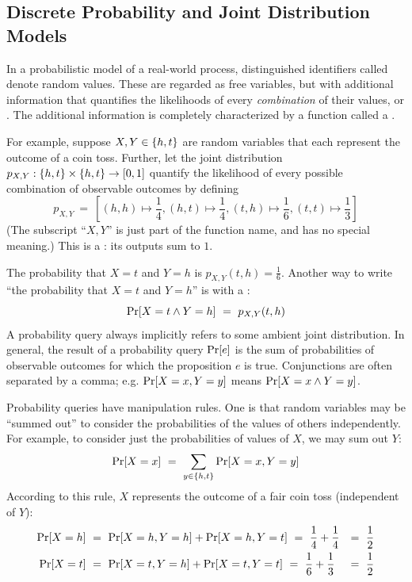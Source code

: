 \subsection{Discrete Probability and Joint Distribution Models}

In a probabilistic model of a real-world process, distinguished identifiers called  denote random values.
These are regarded as free variables, but with additional information that quantifies the likelihoods of every \emph{combination} of their values, or .
The additional information is completely characterized by a function called a .

For example, suppose $X,Y \in \{{h,t}\}$ are random variables that each represent the outcome of a coin toss.
Further, let the joint distribution $p_{X,Y} : \{{h,t}\} \times \{{h,t}\} \to [0,1]$ quantify the likelihood of every possible combination of observable outcomes by defining
\begin{equation}
	p_{X,Y}\ =\ \left[(h,h) \mapsto \frac{1}{4},
		(h,t) \mapsto \frac{1}{4},
		(t,h) \mapsto \frac{1}{6},
		(t,t) \mapsto \frac{1}{3}\right]
\end{equation}
(The subscript ``$X,Y$'' is just part of the function name, and has no special meaning.)
This is a : its outputs sum to $1$.

The probability that $X = t$ and $Y = h$ is $p_{X,Y}(t,h) = \frac{1}{6}$.
Another way to write ``the probability that $X = t$ and $Y = h$'' is with a :
\begin{equation}
	\Pspec{X = t \band Y = h}\ =\ p_{X,Y}(t,h)
\end{equation}
A probability query always implicitly refers to some ambient joint distribution.
In general, the result of a probability query $\mathrm{Pr}\!\left[{e}\right]$ is the sum of probabilities of observable outcomes for which the proposition $e$ is true.
Conjunctions are often separated by a comma; e.g. $\mathrm{Pr}\!\left[{X = x, Y = y}\right]$ means $\mathrm{Pr}\!\left[{X = x \wedge Y = y}\right]$.

Probability queries have manipulation rules.
One is that random variables may be ``summed out'' to consider the probabilities of the values of others independently.
For example, to consider just the probabilities of values of $X$, we may sum out $Y$:
\begin{equation}
	\mathrm{Pr}\!\left[{X = x}\right]\ =\ \sum_{y \in \{{h,t}\}} \mathrm{Pr}\!\left[{X = x, Y = y}\right]
\end{equation}
According to this rule, $X$ represents the outcome of a fair coin toss (independent of $Y$):
\begin{equation}
\begin{aligned}
	\Pspec{X = h}&\ =\ \Pspec{X = h, Y = h} + \Pspec{X = h, Y = t}\ =\ \frac{1}{4} + \frac{1}{4}&=\ \frac{1}{2}
\\
	\Pspec{X = t}&\ =\ \Pspec{X = t, Y = h} + \Pspec{X = t, Y = t}\ =\ \frac{1}{6} + \frac{1}{3}&=\ \frac{1}{2}
\end{aligned}
\end{equation}


